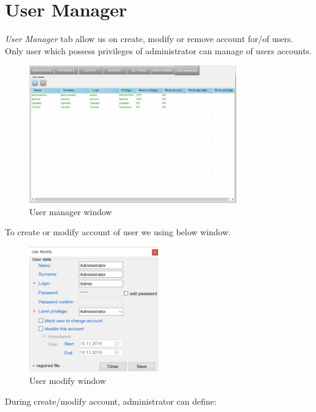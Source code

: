 \section {User Manager}

\textit{User Manager} tab allow us on create,  modify or remove  account for/of users. Only user which possess privileges of administrator can manage of users accounts.

	\begin{figure}[!h] 
	\centering \includegraphics[width=0.8\textwidth]{Graphic/UserManager/UserMangerWindow.png}	
	\caption{User manager window}
	\label{user_mange_window}
	\end{figure}
	\FloatBarrier

To create or modify account of user we using below window.

	\begin{figure}[!h] 
	\centering \includegraphics[width=0.5\textwidth]{Graphic/UserManager/UserModify.png}	
	\caption{User modify window}
	\label{user_ modify_window}
	\end{figure}
	\FloatBarrier

During create/modify account, administrator can define:

